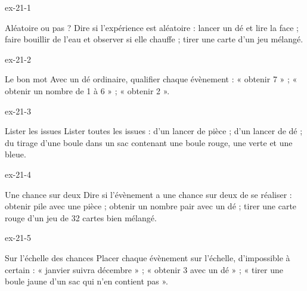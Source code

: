 \clearpage{}
\begin{blocLivre}{ex-21-1}\begin{exercice}[1]{Aléatoire ou pas ?}
Dire si l’expérience est aléatoire : lancer un dé et lire la face ; faire bouillir de l’eau et observer si elle chauffe ; tirer une carte d’un jeu mélangé.
\end{exercice}\end{blocLivre}
\begin{blocLivre}{ex-21-2}\begin{exercice}[1]{Le bon mot}
Avec un dé ordinaire, qualifier chaque évènement : « obtenir 7 » ; « obtenir un nombre de 1 à 6 » ; « obtenir 2 ».
\end{exercice}\end{blocLivre}
\begin{blocLivre}{ex-21-3}\begin{exercice}[1]{Lister les issues}
Lister toutes les issues : d’un lancer de pièce ; d’un lancer de dé ; du tirage d’une boule dans un sac contenant une boule rouge, une verte et une bleue.
\end{exercice}\end{blocLivre}
\begin{blocLivre}{ex-21-4}\begin{exercice}[1]{Une chance sur deux}
Dire si l’évènement a une chance sur deux de se réaliser : obtenir pile avec une pièce ; obtenir un nombre pair avec un dé ; tirer une carte rouge d’un jeu de 32 cartes bien mélangé.
\end{exercice}\end{blocLivre}
\begin{blocLivre}{ex-21-5}\begin{exercice}[1]{Sur l’échelle des chances}
Placer chaque évènement sur l’échelle, d’impossible à certain : « janvier suivra décembre » ; « obtenir 3 avec un dé » ; « tirer une boule jaune d’un sac qui n’en contient pas ».
\label{fig-ex-21-5}
\end{exercice}\end{blocLivre}

